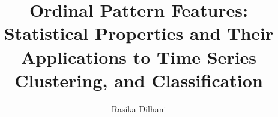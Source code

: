 \documentclass[12pt, oneside, a4paper]{book}
\begin{document}
 
	
	
	\frontmatter
	
	
	\title{Ordinal Pattern Features: Statistical Properties and Their Applications to Time Series Clustering, and Classification}
	
	\author{Rasika Dilhani}
	
\subject{Data Science}
\abstract{%
	
	
}
\end{document}
